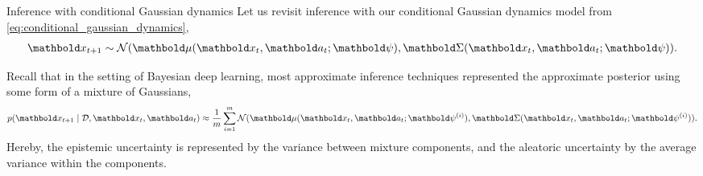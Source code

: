 \begin{ex}{Inference with conditional Gaussian dynamics}{}
  Let us revisit inference with our conditional Gaussian dynamics model from \cref{eq:conditional_gaussian_dynamics}, \begin{align*}
    \vx_{t+1} \sim \N{\vmu(\vx_t, \va_t; \vpsi)}{\mSigma(\vx_t, \va_t; \vpsi)}.
  \end{align*}

  Recall that in the setting of Bayesian deep learning, most approximate inference techniques represented the approximate posterior using some form of a mixture of Gaussians, \begin{align}
    p(\vx_{t+1} \mid \spD, \vx_t, \va_t) \approx \frac{1}{m} \sum_{i=1}^m \N{\vmu(\vx_t, \va_t; \vpsi^{(i)})}{\mSigma(\vx_t, \va_t; \vpsi^{(i)})}.
  \end{align}
  Hereby, the epistemic uncertainty is represented by the variance between mixture components, and the aleatoric uncertainty by the average variance within the components.
\end{ex}

